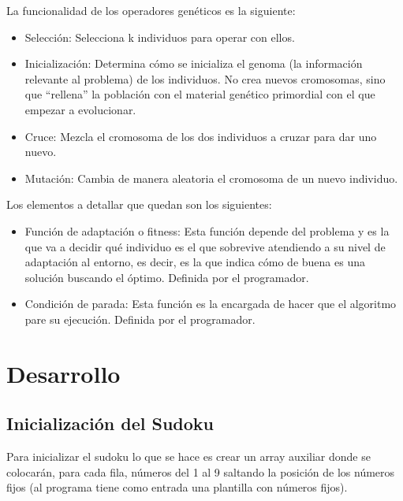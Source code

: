 \documentclass[a4,11pt]{article}
\begin{document}
    
La funcionalidad de los operadores genéticos es la siguiente:

\begin{itemize}
\item Selección: Selecciona k individuos para operar con ellos.

\item Inicialización: Determina cómo se inicializa el genoma (la información relevante al problema) de los individuos. No crea nuevos cromosomas, sino que “rellena” la población con el material genético primordial con el que empezar a evolucionar.

\item Cruce: Mezcla el cromosoma de los dos individuos a cruzar para dar uno nuevo.

\item Mutación: Cambia de manera aleatoria el cromosoma de un nuevo individuo.
\end{itemize}

 
Los elementos a detallar que quedan son los siguientes:

\begin{itemize}

\item Función de adaptación o fitness: Esta función depende del problema y es la que va a decidir qué individuo es el que sobrevive atendiendo a su nivel de adaptación al entorno, es decir, es la que indica cómo de buena es una solución buscando el óptimo. Definida por el programador.

\item Condición de parada: Esta función es la encargada de hacer que el algoritmo pare su ejecución. Definida por el programador.

\end{itemize}

\newpage

\section{Desarrollo}

\subsection{Inicialización del Sudoku}\label{des:init}

Para inicializar el sudoku lo que se hace es crear un array auxiliar donde se colocarán, para cada fila, números del 1 al 9 saltando la posición de los números fijos (al programa tiene como entrada una plantilla con números fijos).
 
\end{document}
